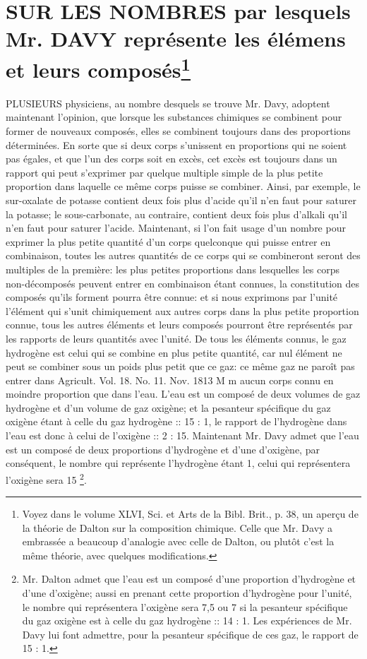 \section{SUR LES NOMBRES par lesquels Mr. DAVY représente les élémens et leurs composés\footnote{Voyez dans le volume XLVI, Sci. et Arts de la Bibl. Brit., p. 38, un aperçu de la théorie de Dalton sur la composition chimique. Celle que Mr. Davy a embrassée a beaucoup d'analogie avec celle de Dalton, ou plutôt c'est la même théorie, avec quelques modifications.}}
PLUSIEURS physiciens, au nombre desquels se trouve Mr. Davy, adoptent maintenant l'opinion, que lorsque les substances chimiques se combinent pour former de nouveaux composés, elles se combinent toujours dans des proportions déterminées. En sorte que si deux corps s'unissent en proportions qui ne soient pas égales, et que l'un des corps soit en excès, cet excès est toujours dans un rapport qui peut s'exprimer\setcounter{page}{452} par quelque multiple simple de la plus petite proportion dans laquelle ce même corps puisse se combiner. Ainsi, par exemple, le sur-oxalate de potasse contient deux fois plus d'acide qu'il n'en faut pour saturer la potasse; le sous-carbonate, au contraire, contient deux fois plus d'alkali qu'il n'en faut pour saturer l'acide.
Maintenant, si l'on fait usage d'un nombre pour exprimer la plus petite quantité d'un corps quelconque qui puisse entrer en combinaison, toutes les autres quantités de ce corps qui se combineront seront des multiples de la première: les plus petites proportions dans lesquelles les corps non-décomposés peuvent entrer en combinaison étant connues, la constitution des composés qu'ils forment pourra être connue: et si nous exprimons par l'unité l'élément qui s'unit chimiquement aux autres corps dans la plus petite proportion connue, tous les autres éléments et leurs composés pourront être représentés par les rapports de leurs quantités avec l'unité.
De tous les éléments connus, le gaz hydrogène est celui qui se combine en plus petite quantité, car nul élément ne peut se combiner sous un poids plus petit que ce gaz: ce même gaz ne paroît pas entrer dans
Agricult. Vol. 18. No. 11. Nov. 1813 M m\setcounter{page}{453} aucun corps connu en moindre proportion que dans l'eau. L'eau est un composé de deux volumes de gaz hydrogène et d'un volume de gaz oxigène; et la pesanteur spécifique du gaz oxigène étant à celle du gaz hydrogène :: 15 : 1, le rapport de l'hydrogène dans l'eau est donc à celui de l'oxigène :: 2 : 15. Maintenant Mr. Davy admet que l'eau est un composé de deux proportions d'hydrogène et d'une d'oxigène, par conséquent, le nombre qui représente l'hydrogène étant 1, celui qui représentera l'oxigène sera 15 \footnote{Mr. Dalton admet que l'eau est un composé d'une proportion d'hydrogène et d'une d'oxigène; aussi en prenant cette proportion d'hydrogène pour l'unité, le nombre qui représentera l'oxigène sera 7,5 ou 7 si la pesanteur spécifique du gaz oxigène est à celle du gaz hydrogène :: 14 : 1. Les expériences de Mr. Davy lui font admettre, pour la pesanteur spécifique de ces gaz, le rapport de 15 : 1.}.
